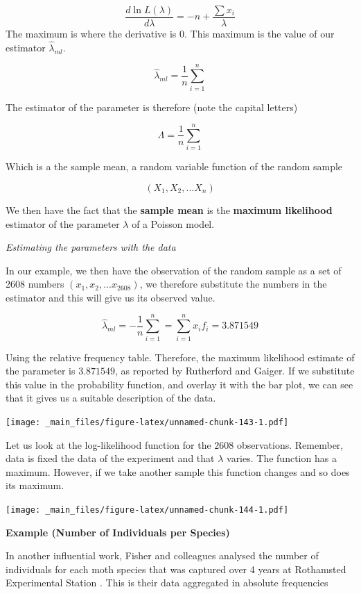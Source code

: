 \documentclass[
]{book}
\begin{document}
\[\frac{d \ln L(\lambda)}{d \lambda}= -n + \frac{\sum{x_i}}{\lambda}\]
The maximum is where the derivative is \(0\). This maximum is the value of our estimator \(\hat{\lambda}_{ml}\).

\[\hat{\lambda}_{ml}=\frac{1}{n}\sum_{i=1}^{n}\]

The estimator of the parameter is therefore (note the capital letters)

\[\Lambda=\frac{1}{n}\sum_{i=1}^{n}\]

Which is a the sample mean, a random variable function of the random sample

\[(X_1, X_2, ... X_n)\]

We then have the fact that the \textbf{sample mean} is the \textbf{maximum likelihood} estimator of the parameter \(\lambda\) of a Poisson model.

\emph{Estimating the parameters with the data}

In our example, we then have the observation of the random sample as a set of 2608 numbers \((x_1, x_2, ...x_{2608})\), we therefore substitute the numbers in the estimator and this will give us its observed value.

\[\hat{\lambda}_{ml}=-\frac{1}{n}\sum_{i=1}^{n} =\sum_{i=1}^{n} x_if_i =3.871549\]

Using the relative frequency table. Therefore, the maximum likelihood estimate of the parameter is \(3.871549\), as reported by Rutherford and Gaiger. If we substitute this value in the probability function, and overlay it with the bar plot, we can see that it gives us a suitable description of the data.

\texttt{[image: \_main\_files/figure-latex/unnamed-chunk-143-1.pdf]}

Let us look at the log-likelihood function for the \(2608\) observations. Remember, data is fixed the data of the experiment and that \(\lambda\) varies. The function has a maximum. However, if we take another sample this function changes and so does its maximum.

\texttt{[image: \_main\_files/figure-latex/unnamed-chunk-144-1.pdf]}

\textbf{Example (Number of Individuals per Species)}

In another influential work, Fisher and colleagues analysed the number of individuals for each moth species that was captured over 4 years at Rothamsted Experimental Station \citep{fisher1943species}. This is their data aggregated in absolute frequencies
\end{document}
